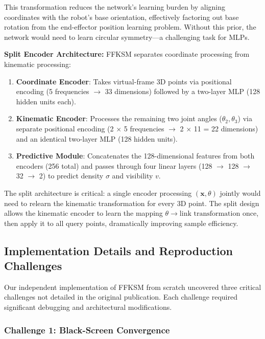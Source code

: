 \documentclass[12pt,a4paper,oneside]{report}
\begin{document}
This transformation reduces the network's learning burden by aligning coordinates with the robot's base orientation, effectively factoring out base rotation from the end-effector position learning problem. Without this prior, the network would need to learn circular symmetry---a challenging task for MLPs.

\textbf{Split Encoder Architecture:} FFKSM separates coordinate processing from kinematic processing:

\begin{enumerate}
    \item \textbf{Coordinate Encoder}: Takes virtual-frame 3D points via positional encoding (5 frequencies $\rightarrow$ 33 dimensions) followed by a two-layer MLP (128 hidden units each).
    \item \textbf{Kinematic Encoder}: Processes the remaining two joint angles ($\theta_2, \theta_3$) via separate positional encoding (2 $\times$ 5 frequencies $\rightarrow$ 2 $\times$ 11 = 22 dimensions) and an identical two-layer MLP (128 hidden units).
    \item \textbf{Predictive Module}: Concatenates the 128-dimensional features from both encoders (256 total) and passes through four linear layers (128 $\rightarrow$ 128 $\rightarrow$ 32 $\rightarrow$ 2) to predict density $\sigma$ and visibility $v$.
\end{enumerate}

The split architecture is critical: a single encoder processing $(\mathbf{x}, \theta)$ jointly would need to relearn the kinematic transformation for every 3D point. The split design allows the kinematic encoder to learn the mapping $\theta \rightarrow \text{link transformation}$ once, then apply it to all query points, dramatically improving sample efficiency.

\subsection{Implementation Details and Reproduction Challenges}

Our independent implementation of FFKSM from scratch uncovered three critical challenges not detailed in the original publication. Each challenge required significant debugging and architectural modifications.

\subsubsection{Challenge 1: Black-Screen Convergence}
\end{document}
